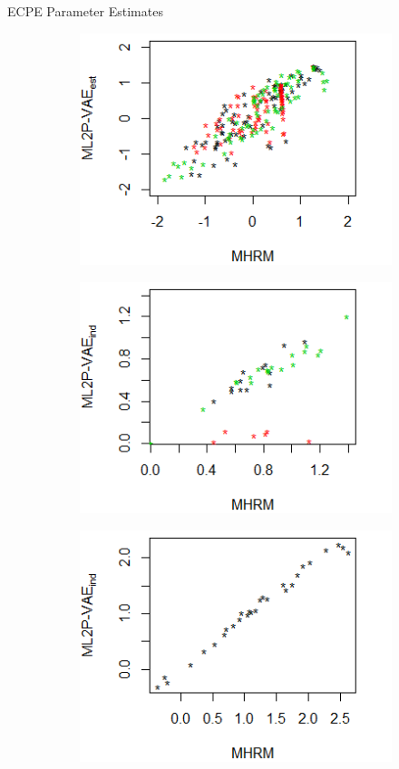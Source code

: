 \documentclass{beamer}
\theoremstyle{definition}
\begin{document}
\begin{frame}{ECPE Parameter Estimates}
\begin{figure}[h]
\begin{subfigure}{.32\textwidth}
      \includegraphics[width=.9\linewidth]{../img/ml_journal_results/ecpe/vae_est_theta_ecpe.png}
    \end{subfigure}
    \begin{subfigure}{.32\textwidth}
      \centering
      \includegraphics[width=.9\linewidth]{../img/ml_journal_results/ecpe/vae_ind_disc_ecpe.png}
    \end{subfigure}
    \begin{subfigure}{.32\textwidth}
      \centering
      \includegraphics[width=.9\linewidth]{../img/ml_journal_results/ecpe/vae_ind_diff_ecpe.png}

\end{subfigure}
\end{figure}
\end{frame}
\end{document}
